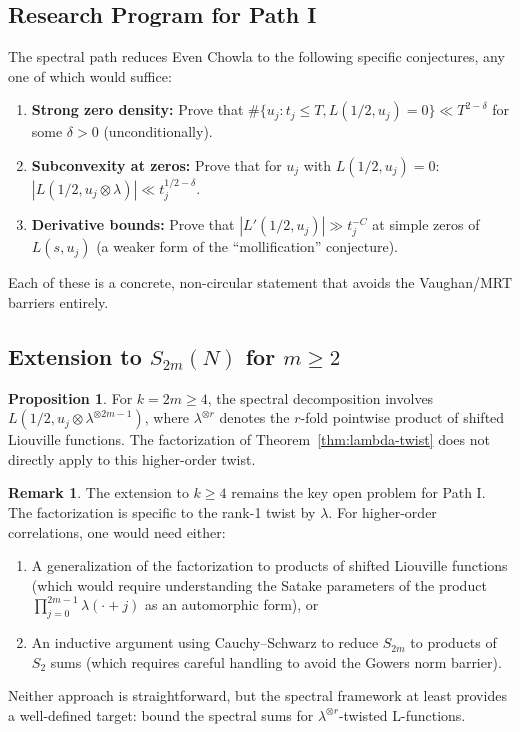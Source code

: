 \documentclass[11pt,a4paper]{article}
\theoremstyle{definition}
\newtheorem{proposition}[theorem]{Proposition}
\newtheorem{remark}[theorem]{Remark}
\begin{document}
\subsection{Research Program for Path I}

The spectral path reduces Even Chowla to the following specific conjectures, any one of which would suffice:

\begin{enumerate}
\item \textbf{Strong zero density:} Prove that $\#\{u_j : t_j \le T, L(1/2, u_j) = 0\} \ll T^{2-\delta}$ for some $\delta > 0$ (unconditionally).

\item \textbf{Subconvexity at zeros:} Prove that for $u_j$ with $L(1/2, u_j) = 0$: $|L(1/2, u_j \otimes \lambda)| \ll t_j^{1/2-\delta}$.

\item \textbf{Derivative bounds:} Prove that $|L'(1/2, u_j)| \gg t_j^{-C}$ at simple zeros of $L(s, u_j)$ (a weaker form of the ``molliﬁcation'' conjecture).
\end{enumerate}

Each of these is a concrete, non-circular statement that avoids the Vaughan/MRT barriers entirely.

\subsection{Extension to $S_{2m}(N)$ for $m \ge 2$}

\begin{proposition}
\label{prop:extension-2m}
For $k = 2m \ge 4$, the spectral decomposition involves $L(1/2, u_j \otimes \lambda^{\otimes 2m-1})$, where $\lambda^{\otimes r}$ denotes the $r$-fold pointwise product of shifted Liouville functions. The factorization of Theorem~\ref{thm:lambda-twist} does not directly apply to this higher-order twist.
\end{proposition}

\begin{remark}
The extension to $k \ge 4$ remains the key open problem for Path I. The factorization is specific to the rank-1 twist by $\lambda$. For higher-order correlations, one would need either:
\begin{enumerate}
\item A generalization of the factorization to products of shifted Liouville functions (which would require understanding the Satake parameters of the product $\prod_{j=0}^{2m-1} \lambda(\cdot+j)$ as an automorphic form), or
\item An inductive argument using Cauchy--Schwarz to reduce $S_{2m}$ to products of $S_2$ sums (which requires careful handling to avoid the Gowers norm barrier).
\end{enumerate}
Neither approach is straightforward, but the spectral framework at least provides a well-defined target: bound the spectral sums for $\lambda^{\otimes r}$-twisted L-functions.
\end{remark}
\end{document}
